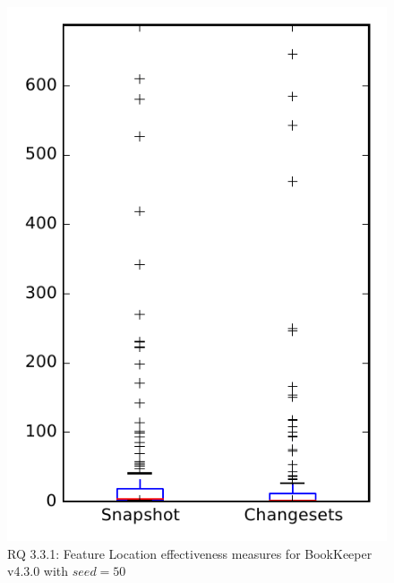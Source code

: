 
\begin{figure}
\centering
\includegraphics[height=0.4\textheight]{figures/flt_seed/rq1_bookkeeper_50}
\caption{RQ 3.3.1: Feature Location effectiveness measures for BookKeeper v4.3.0 with $seed=50$}
\label{fig:flt_seed:rq1:bookkeeper}
\end{figure}
